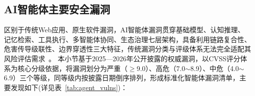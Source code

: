 



\subsection{AI智能体主要安全漏洞}
区别于传统Web应用、原生软件漏洞，AI智能体漏洞贯穿基础模型、认知推理、记忆检索、工具执行、多智能体协同、生态治理七层架构，具备利用链路复合性、危害传导级联性、边界穿透性三大特征，传统漏洞分类与评级体系无法完全适配其风险评估需求~\cite{nvdCVE2025_68664,nvdCVE2026_40933}。
本小节基于2025—2026年公开披露的权威漏洞，以CVSS评分体系为核心分级依据，将漏洞划分为严重（$\ge$9.0）、高危（7.0$\sim$8.9）、中危（4.0$\sim$6.9）三个等级，同等级内按披露日期倒序排列，形成标准化智能体漏洞清单，主要发现如下(详见表~\ref{tab:agent_vulns})：

